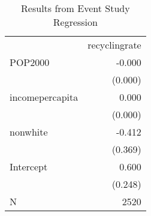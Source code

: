 \documentclass{article}
\begin{document}
\begin{table}[!h]
\caption{Results from Event Study Regression}
\centering
\begin{tabular}{ll}
\cline{1-2}
\multicolumn{1}{r}{} &
  \multicolumn{1}{c}{recyclingrate} \\
\cline{1-2}
\multicolumn{1}{l}{POP2000} &
  \multicolumn{1}{r}{-0.000} \\
\multicolumn{1}{l}{} &
  \multicolumn{1}{r}{(0.000)} \\
\multicolumn{1}{l}{incomepercapita} &
  \multicolumn{1}{r}{0.000} \\
\multicolumn{1}{l}{} &
  \multicolumn{1}{r}{(0.000)} \\
\multicolumn{1}{l}{nonwhite} &
  \multicolumn{1}{r}{-0.412} \\
\multicolumn{1}{l}{} &
  \multicolumn{1}{r}{(0.369)} \\
\multicolumn{1}{l}{Intercept} &
  \multicolumn{1}{r}{0.600} \\
\multicolumn{1}{l}{} &
  \multicolumn{1}{r}{(0.248)} \\
\multicolumn{1}{l}{N} &
  \multicolumn{1}{r}{2520} \\
\cline{1-2}
\end{tabular}
\end{table}
\end{document}
